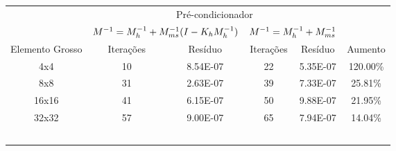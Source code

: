 \begin{table}[]
\begin{tabular}{cccccc}
\cline{2-5}
\multicolumn{1}{c|}{}                 & \multicolumn{4}{c|}{Pré-condicionador}                                                                                          &                               \\ \cline{2-5}
\multicolumn{1}{c|}{}                 & \multicolumn{2}{c|}{$M^{-1}=M^{-1}_{h} + M^{-1}_{ms}(I-K_hM^{-1}_{h})$}                             & \multicolumn{2}{c|}{$M^{-1}=M^{-1}_{h} + M^{-1}_{ms}$}                              &                               \\ \hline
\multicolumn{1}{|c|}{Elemento Grosso} & \multicolumn{1}{c|}{Iterações} & \multicolumn{1}{c|}{Resíduo}  & \multicolumn{1}{c|}{Iterações} & \multicolumn{1}{c|}{Resíduo}  & \multicolumn{1}{c|}{Aumento}  \\ \hline
\multicolumn{1}{|c|}{4x4}             & \multicolumn{1}{c|}{10}        & \multicolumn{1}{c|}{8.54E-07} & \multicolumn{1}{c|}{22}        & \multicolumn{1}{c|}{5.35E-07} & \multicolumn{1}{c|}{120.00\%} \\ \hline
\multicolumn{1}{|c|}{8x8}             & \multicolumn{1}{c|}{31}        & \multicolumn{1}{c|}{2.63E-07} & \multicolumn{1}{c|}{39}        & \multicolumn{1}{c|}{7.33E-07} & \multicolumn{1}{c|}{25.81\%}  \\ \hline
\multicolumn{1}{|c|}{16x16}           & \multicolumn{1}{c|}{41}        & \multicolumn{1}{c|}{6.15E-07} & \multicolumn{1}{c|}{50}        & \multicolumn{1}{c|}{9.88E-07} & \multicolumn{1}{c|}{21.95\%}  \\ \hline
\multicolumn{1}{|c|}{32x32}           & \multicolumn{1}{c|}{57}        & \multicolumn{1}{c|}{9.00E-07} & \multicolumn{1}{c|}{65}        & \multicolumn{1}{c|}{7.94E-07} & \multicolumn{1}{c|}{14.04\%}  \\ \hline
                                      &                                &                               &                                &                               &                               \\
\multicolumn{1}{l}{}                  & \multicolumn{1}{l}{}           & \multicolumn{1}{l}{}          & \multicolumn{1}{l}{}           & \multicolumn{1}{l}{}          & \multicolumn{1}{l}{}          \\
\multicolumn{1}{l}{}                  & \multicolumn{1}{l}{}           & \multicolumn{1}{l}{}          & \multicolumn{1}{l}{}           & \multicolumn{1}{l}{}          & \multicolumn{1}{l}{}          \\
\multicolumn{1}{l}{}                  & \multicolumn{1}{l}{}           & \multicolumn{1}{l}{}          & \multicolumn{1}{l}{}           & \multicolumn{1}{l}{}          & \multicolumn{1}{l}{}          \\
\multicolumn{1}{l}{}                  & \multicolumn{1}{l}{}           & \multicolumn{1}{l}{}          & \multicolumn{1}{l}{}           & \multicolumn{1}{l}{}          & \multicolumn{1}{l}{}         
\end{tabular}
\end{table}


